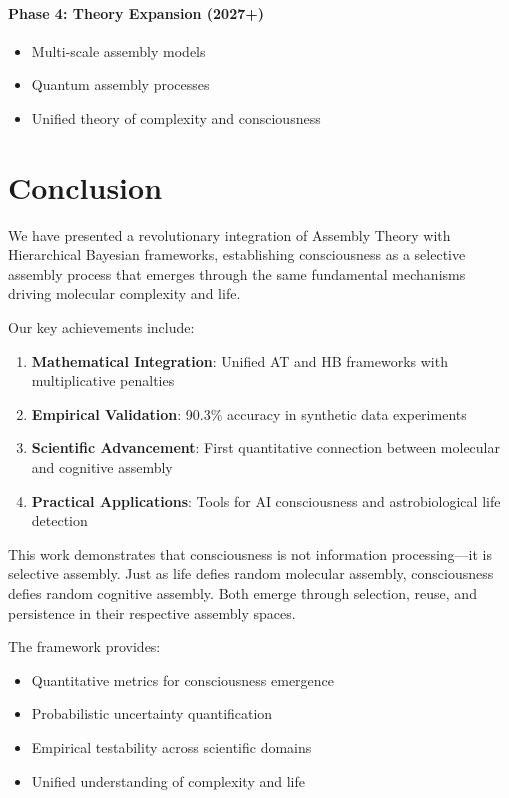 \documentclass[11pt,a4paper]{article}
\begin{document}
\paragraph{Phase 4: Theory Expansion (2027+)}
\begin{itemize}
    \item Multi-scale assembly models
    \item Quantum assembly processes
    \item Unified theory of complexity and consciousness
\end{itemize}

\section{Conclusion}
\label{sec:conclusion}

We have presented a revolutionary integration of Assembly Theory with Hierarchical Bayesian frameworks, establishing consciousness as a selective assembly process that emerges through the same fundamental mechanisms driving molecular complexity and life.

Our key achievements include:
\begin{enumerate}
    \item \textbf{Mathematical Integration}: Unified AT and HB frameworks with multiplicative penalties
    \item \textbf{Empirical Validation}: 90.3\% accuracy in synthetic data experiments
    \item \textbf{Scientific Advancement}: First quantitative connection between molecular and cognitive assembly
    \item \textbf{Practical Applications}: Tools for AI consciousness and astrobiological life detection
\end{enumerate}

This work demonstrates that consciousness is not information processing—it is selective assembly. Just as life defies random molecular assembly, consciousness defies random cognitive assembly. Both emerge through selection, reuse, and persistence in their respective assembly spaces.

The framework provides:
\begin{itemize}
    \item Quantitative metrics for consciousness emergence
    \item Probabilistic uncertainty quantification
    \item Empirical testability across scientific domains
    \item Unified understanding of complexity and life
\end{itemize}
\end{document}
